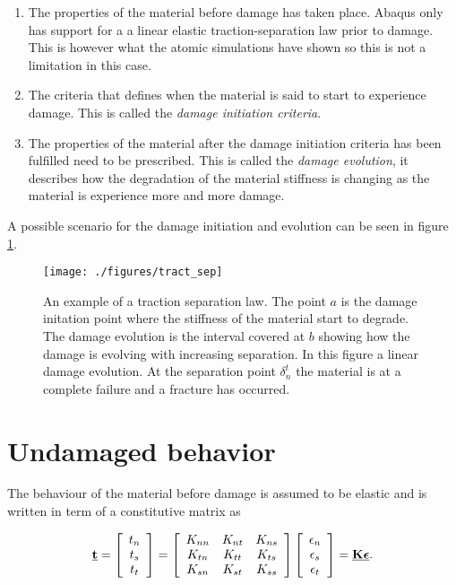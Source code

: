 \documentclass[generate_interface_elements.tex]{subfiles}
\begin{document}
\begin{enumerate}
\item The properties of the material before damage has taken place. Abaqus only has support for a a linear elastic traction-separation law prior to damage. This is however what the atomic simulations have shown so this is not a limitation in this case.

\item The criteria that defines when the material is said to start to experience damage. This is called the \textit{damage initiation criteria}.

\item The properties of the material after the damage initiation criteria has been fulfilled need to be prescribed. This is called the \textit{damage evolution}, it describes how the degradation of the material stiffness is changing as the material is experience more and more damage.
\end{enumerate}
%
A possible scenario for the damage initiation and evolution can be seen in figure \ref{fig:tract_sep}.



\begin{figure}
\centering
  \texttt{[image: ./figures/tract\_sep]}
\caption{An example of a traction separation law. The point $a$ is the damage initation point where the stiffness of the material start to degrade. The damage evolution is the interval covered at $b$ showing how the damage is evolving with increasing separation. In this figure a linear damage evolution. At the separation point $\delta_n^t$ the material is at a complete failure and a fracture has occurred.}
\label{fig:tract_sep}
\end{figure}

\section{Undamaged behavior}
 
 The behaviour of the material before damage is assumed to be elastic and is written in term of a constitutive matrix as
 
 \[ \vec{t} = 
 \left[
\begin{array}{c c c}
t_n\\
t_s\\
t_t \\
\end{array} \right]
=
\left[
\begin{array}{c c c}
K_{nn} & K_{nt} & K_{ns} \\
K_{tn} & K_{tt} & K_{ts} \\
K_{sn} & K_{st} & K_{ss} \\
\end{array} \right]
 \left[
\begin{array}{c c c}
\epsilon_n\\
\epsilon_s\\
\epsilon_t \\
\end{array} \right]
= \vec{K} \vec{\epsilon}.
\]
\end{document}
